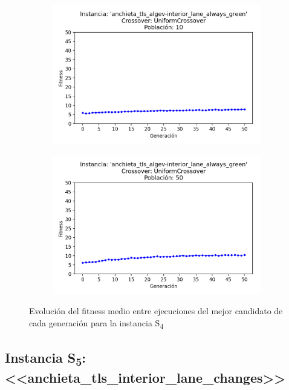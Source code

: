\begin{figure}[h]
\begin{subfigure}[t]{.49\textwidth}
      \centering
      \includegraphics[width=\textwidth]{report/images/estudio/anchieta_tls_algev-interior_lane_always_green-UniformCrossover-10.png}
    \end{subfigure}
    \hfill
    \begin{subfigure}[t]{.49\textwidth}
      \centering
      \includegraphics[width=\textwidth]{report/images/estudio/anchieta_tls_algev-interior_lane_always_green-UniformCrossover-50.png}
    \end{subfigure}
    \caption{Evolución del fitness medio entre ejecuciones del mejor candidato de cada generación para la instancia S\textsubscript{4}}
    \label{fig:estudio:anchieta_tls_interior_lane_always_green}
\end{figure}

\subsection{Instancia S\textsubscript{5}: <<anchieta\_tls\_interior\_lane\_changes>>}

